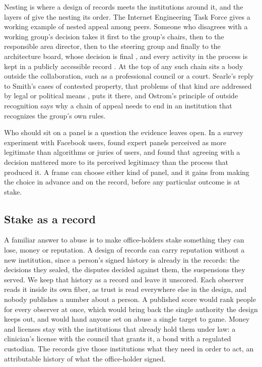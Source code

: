 Nesting is where a design of records meets the institutions around it, and the layers of
 give the nesting its order. The Internet Engineering Task Force gives a working
example of nested appeal among peers. Someone who disagrees with a working group's decision takes it
first to the group's chairs, then to the responsible area director, then to the steering group and
finally to the architecture board, whose decision is final \citep[\S6.5.1]{rfc2026}, and every
activity in the process is kept in a publicly accessible record \citep[\S8]{rfc2026}. At the top of
any such chain sits a body outside the collaboration, such as a professional council or a court.
Searle's reply to Smith's cases of contested property, that problems of that kind are addressed by
legal or political means \citep{smithsearle2003}, puts it there, and Ostrom's principle of outside
recognition says why a chain of appeal needs to end in an institution that recognizes the group's
own rules.

Who should sit on a panel is a question the evidence leaves open. In a survey experiment with
Facebook users, \citet{pan2022} found expert panels perceived as more legitimate than algorithms or
juries of users, and found that agreeing with a decision mattered more to its perceived legitimacy
than the process that produced it. A frame can choose either kind of panel,
and it gains from making the choice in advance and on the record, before any particular outcome is
at stake.

\subsection{Stake as a record}\label{sec:stake}

A familiar answer to abuse is to make office-holders stake something they can lose, money or
reputation. A design of records can carry reputation without a new institution, since a person's
signed history is already in the records: the decisions they sealed, the disputes decided against
them, the suspensions they served. We keep that history as a record and leave it unscored. Each
observer reads it inside its own fiber, as trust is read everywhere else in the design, and nobody
publishes a number about a person. A published score would rank people for every observer at once,
which would bring back the single authority the design keeps out, and would hand anyone set on abuse
a single target to game. Money and licenses stay with the institutions that already hold them under
law: a clinician's license with the council that grants it, a bond with a regulated custodian. The
records give those institutions what they need in order to act, an attributable history of what the
office-holder signed.

